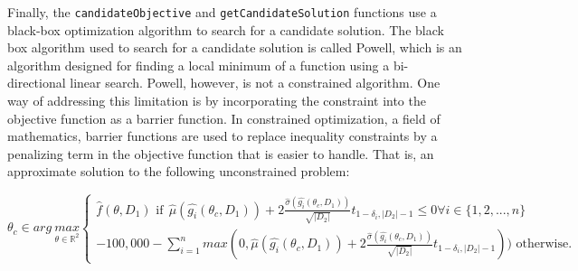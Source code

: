 \documentclass[12pt, twoside]{amherstthesis}
\begin{document}
\noindent Finally, the \texttt{candidateObjective} and \texttt{getCandidateSolution} functions use a black-box optimization algorithm to search for a candidate solution. The black box algorithm used to search for a candidate solution is called Powell, which is an algorithm designed for finding a local minimum of a function using a bi-directional linear search. Powell, however, is not a constrained algorithm. One way of addressing this limitation is by incorporating the constraint into the objective function as a barrier function. In constrained optimization, a field of mathematics, barrier functions are used to replace inequality constraints by a penalizing term in the objective function that is easier to handle. That is, an approximate solution to the following unconstrained problem:

\[
\theta_c \in arg \: \underset{\theta \in \mathbb{R}^2}{max} 
    \begin{cases} 
      \hat{f}(\theta, D_1)  \text{    if} \:\: \hat{\mu}(\hat{g_i}(\theta_c, D_1)) + 2 \frac{\hat{\sigma}(\hat{g_i}(\theta_c, D_1))}{\sqrt{|D_2|}} t_{1-\delta_i, |D_2|-1} \leq 0 \forall i \in \{1,2,...,n\}\\
      -100,000 - \sum_{i=1}^n max(0, \hat{\mu}(\hat{g_i}(\theta_c, D_1)) + 2 \frac{\hat{\sigma}(\hat{g_i}(\theta_c, D_1))}{\sqrt{|D_2|}} t_{1-\delta_i, |D_2|-1})) \text{  otherwise.}
    \end{cases}
\]
\end{document}
